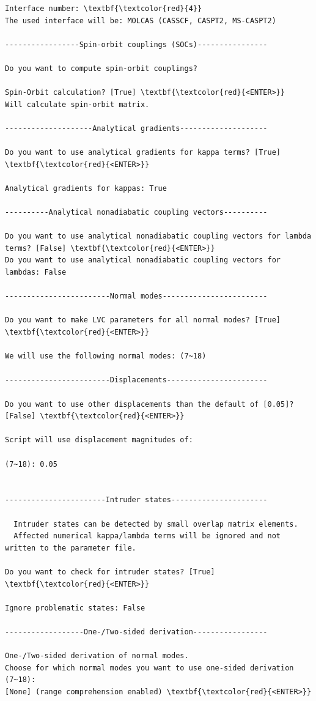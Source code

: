 \documentclass[a4paper,11pt,DIV=15,openany]{scrbook}
\begin{document}
\begin{oframed}
\begin{Verbatim}[commandchars=\\\{\}]
Interface number: \textbf{\textcolor{red}{4}}
The used interface will be: MOLCAS (CASSCF, CASPT2, MS-CASPT2)

-----------------Spin-orbit couplings (SOCs)----------------

Do you want to compute spin-orbit couplings?

Spin-Orbit calculation? [True] \textbf{\textcolor{red}{<ENTER>}}
Will calculate spin-orbit matrix.

--------------------Analytical gradients--------------------

Do you want to use analytical gradients for kappa terms? [True] \textbf{\textcolor{red}{<ENTER>}}

Analytical gradients for kappas: True

----------Analytical nonadiabatic coupling vectors----------

Do you want to use analytical nonadiabatic coupling vectors for lambda terms? [False] \textbf{\textcolor{red}{<ENTER>}}
Do you want to use analytical nonadiabatic coupling vectors for lambdas: False

------------------------Normal modes------------------------

Do you want to make LVC parameters for all normal modes? [True] \textbf{\textcolor{red}{<ENTER>}}

We will use the following normal modes: (7~18)

------------------------Displacements-----------------------

Do you want to use other displacements than the default of [0.05]? [False] \textbf{\textcolor{red}{<ENTER>}}

Script will use displacement magnitudes of:

(7~18): 0.05
 

-----------------------Intruder states----------------------

  Intruder states can be detected by small overlap matrix elements.
  Affected numerical kappa/lambda terms will be ignored and not written to the parameter file.

Do you want to check for intruder states? [True] \textbf{\textcolor{red}{<ENTER>}}

Ignore problematic states: False

------------------One-/Two-sided derivation-----------------

One-/Two-sided derivation of normal modes.
Choose for which normal modes you want to use one-sided derivation (7~18): 
[None] (range comprehension enabled) \textbf{\textcolor{red}{<ENTER>}}


\end{Verbatim}
\end{oframed}
\end{document}
